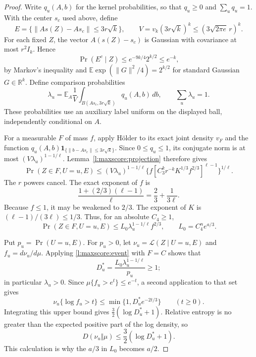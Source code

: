 \begin{proof}
Write \(q_u(A,b)\) for the kernel probabilities, so that
\(q_u\ge0\) and \(\sum_uq_u=1\).  With the center \(s_c\)
used above, define
\[
 E=\{\|As(Z)-As_c\|\le3r\sqrt k\},\qquad
 V=v_k(3r\sqrt k)^k\le(3\sqrt{2\pi e}\,r)^k.
\]
For each fixed \(Z\), the vector \(A(s(Z)-s_c)\) is Gaussian
with covariance at most \(r^2I_k\).  Hence
\[
 \Pr(E^c\mid Z)\le e^{-9k/4}2^{k/2}\le e^{-k},
\]
by Markov's inequality and
\(\mathbb E\exp(\|G\|^2/4)=2^{k/2}\) for standard Gaussian
\(G\in\mathbb R^k\).
Define comparison probabilities
\[
 \lambda_u=\mathbb E_A\frac1V
       \int_{B(As_c,3r\sqrt k)}q_u(A,b)\,db,
 \qquad \sum_u\lambda_u=1.
\]
These probabilities use an auxiliary label uniform on the displayed
ball, independently conditional on \(A\).

For a measurable \(F\) of mass \(f\), apply H\"older to its exact
joint density \(v_F\) and the function
\(q_u(A,b)\mathbf1_{\{\|b-As_c\|\le3r\sqrt k\}}\).
Since \(0\le q_u\le1\), its conjugate norm is at most
\((V\lambda_u)^{1-1/\ell}\).  Lemma~\ref{l:maxscore:projection}
therefore gives
\[
 \Pr(Z\in F,U=u,E)
 \le (V\lambda_u)^{1-1/\ell}
       \{f[C_3^kr^{-k}K^{1/3}f^{2/3}]^{\ell-1}\}^{1/\ell}.
\]
The \(r\) powers cancel.  The exact exponent of \(f\) is
\[
 \frac{1+(2/3)(\ell-1)}{\ell}
 =\frac23+\frac1{3\ell}.
\]
Because \(f\le1\), it may be weakened to \(2/3\).
The exponent of \(K\) is \((\ell-1)/(3\ell)\le1/3\).
Thus, for an absolute \(C_4\ge1\),
\begin{equation}\label{l:maxscore:event}
 \Pr(Z\in F,U=u,E)
 \le L_0\lambda_u^{1-1/\ell}f^{2/3},
 \qquad L_0=C_4^ne^{a/3}.
\end{equation}

Put \(p_u=\Pr(U=u,E)\).  For \(p_u>0\), let
\(\nu_u=\mathcal L(Z\mid U=u,E)\) and \(f_u=d\nu_u/d\mu\).
Applying \eqref{l:maxscore:event} with \(F=C\) shows that
\[
 D_u^*=\frac{L_0\lambda_u^{1-1/\ell}}{p_u}\ge1;
\]
in particular \(\lambda_u>0\).  Since
\(\mu\{f_u>e^t\}\le e^{-t}\), a second application to that set
gives
\[
 \nu_u\{\log f_u>t\}\le\min\{1,D_u^*e^{-2t/3}\}
 \qquad(t\ge0).
\]
Integrating this upper bound gives
\(\tfrac32(\log D_u^*+1)\).  Relative entropy is no greater than
the expected positive part of the log density, so
\begin{equation}\label{l:maxscore:posterior-kl}
 D(\nu_u\Vert\mu)\le\frac32(\log D_u^*+1).
\end{equation}
This calculation is why the \(a/3\) in \(L_0\) becomes \(a/2\).


\end{proof}
